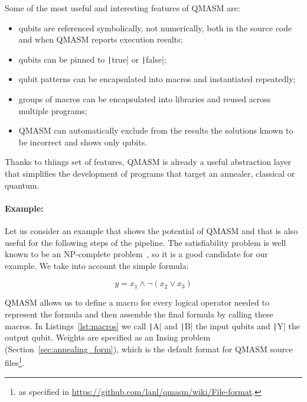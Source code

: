 Some of the most useful and interesting features of QMASM are:
\begin{itemize}
	\item qubits are referenced symbolically, not numerically, both in the source code and when QMASM reports execution results;
	\item qubits can be pinned to \texttt|true| or \texttt|false|;
	\item qubit patterns can be encapsulated into macros and instantiated repeatedly;
	\item groups of macros can be encapsulated into libraries and reused across multiple programs;
	\item QMASM can automatically exclude from the results the solutions known to be incorrect and shows only  qubits.
\end{itemize}

Thanks to thiings set of features, QMASM is already a useful abstraction layer that simplifies the development of programs that target an annealer, classical or quantum.

\paragraph{Example:} Let us consider an example that shows the potential of QMASM and that is also useful for the following steps of the pipeline. The satisfiability problem is well known to be an NP-complete problem~\cite{garey2002computers}, so it is a good candidate for our example. We take into account the simple formula:

\begin{equation}
	y = x_1 \land \neg(x_2 \lor x_3)
	\label{eqn:simple_logic}
\end{equation}

QMASM allows us to define a macro for every logical operator needed to represent the formula and then assemble the final formula by calling these macros. In Listings~\ref{lst:macros} we call \texttt|A| and \texttt|B| the input qubits and \texttt|Y| the output qubit. Weights are specified as an Insing problem (Section~\ref{sec:annealing_form}), which is the default format for QMASM source files\footnote{as specified in \url{https://github.com/lanl/qmasm/wiki/File-format}.}.

